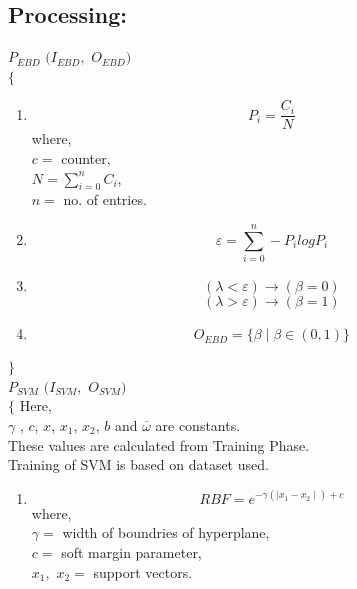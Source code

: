 \documentclass[12pt,a4paper,final]{report}
\DeclareRobustCommand{\gobblefive}[5]{}
\newcommand*{\SkipTocEntry}{\addtocontents{toc}{\gobblefive}}
\begin{document}
{{{{\SkipTocEntry\subsection{Processing:}
$P_{EBD} $ $ (I_{EBD},$ $O_{EBD})$\\
$\lbrace$

\begin{enumerate}

\item 
{\setlength{\mathindent}{0cm}}
\begin{equation}
P_{i} = \frac{C_{i}}{N}
\end{equation}
where, \\ $c =$ counter, \\ $N = \sum_{i=0}^{n} C_{i}$, \\ $n =$ no. of entries.

\item 
{\setlength{\mathindent}{0cm}}
\begin{equation}
\varepsilon = \sum_{i=0}^{n} - P_{i} log P_{i}
\end{equation}

\newpage
\item 
\begin{equation}
(\lambda < \varepsilon) \rightarrow (\beta = 0)
\end{equation}
\begin{equation}
(\lambda > \varepsilon) \rightarrow (\beta = 1)
\end{equation}

\item  
\begin{equation}
O_{EBD} = \lbrace \beta \mid \beta \in (0,1) \rbrace
\end{equation}

\end{enumerate}

$\rbrace$
\\

\noindent
$P_{SVM} $ $ (I_{SVM},$ $O_{SVM})$\\
$\lbrace$
\indent
Here, \\
\indent $\gamma$ , $c$, $x$, $x_{1}$, $x_{2}$, $b$ and $\overline{\omega}$ are constants.\\
\indent These values are calculated from Training Phase.\\
\indent Training of SVM is based on dataset used.


\begin{enumerate}

\item 
\begin{equation}
RBF = e^{-\gamma(\mid x_{1}-x_{2} \mid)+c}
\end{equation}
where, \\ $\gamma =$ width of boundries of hyperplane, \\ $c =$ soft margin parameter, \\ $x_{1}, $ $x_{2} =$ support vectors.



\end{enumerate}}}}}
\end{document}
